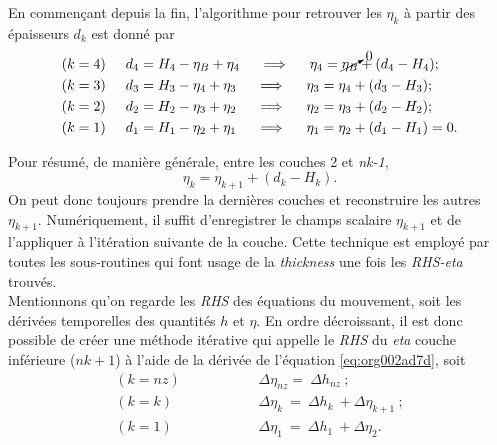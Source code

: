 \documentclass[10pt]{article}
\numberwithin{equation}{section}
\begin{document}
En commençant depuis la fin, l'algorithme pour retrouver les \(\eta_k\) à partir des épaisseurs \(d_k\) est donné par
\begin{align}
        & (k=4) \hspace{0.5cm} d_4 = H_4 - \eta_B + \eta_4 \hspace{0.5cm} \Longrightarrow \hspace{0.5cm} \eta_4 = \cancelto{0}{\eta_B} + (d_4 - H_4); \\
        & (k=3) \hspace{0.5cm} d_3 = H_3 - \eta_4 + \eta_3 \hspace{0.5cm} \Longrightarrow \hspace{0.5cm} \eta_3 =\eta_4+(d_3-H_3);\\
        & (k=2) \hspace{0.5cm} d_2 = H_2 - \eta_3 + \eta_2 \hspace{0.5cm} \Longrightarrow \hspace{0.5cm} \eta_2 =\eta_3+(d_2-H_2);\\
        & (k=1) \hspace{0.5cm} d_1 = H_1 - \eta_2 + \eta_1 \hspace{0.5cm} \Longrightarrow \hspace{0.5cm} \eta_1 =\eta_2+(d_1-H_1) = 0.
\end{align}

Pour résumé, de manière générale, entre les couches 2 et \emph{nk-1},
\begin{equation}
\label{eq:org002ad7d}
\eta_k = \eta_{k+1} + (d_k - H_k).
\end{equation}
On peut donc toujours prendre la dernières couches et reconstruire les autres \(\eta_{k+1}\).
Numériquement, il suffit d'enregistrer le champs scalaire \(\eta_{k+1}\) et de l'appliquer à l'itération suivante de la couche.
Cette technique est employé par toutes les sous-routines qui font usage de la \emph{thickness} une fois les \emph{RHS-eta} trouvés.\\


Mentionnons qu'on regarde les \emph{RHS} des équations du mouvement, soit les dérivées temporelles des quantités \(h\) et \(\eta\).
En ordre décroissant, il est donc possible de créer une méthode itérative qui appelle le \emph{RHS} du \emph{eta} couche inférieure (\(nk+1\)) à l'aide de la dérivée de l'équation \ref{eq:org002ad7d}, soit
\begin{align}
(k=nz)\hspace{2cm}    &\Delta \eta_{nz} =\ \Delta h_{nz}\ ;\nonumber\\
(k=k) \hspace{2cm} &\Delta \eta_{k}\ = \ \Delta h_k\ + \Delta \eta_{k+1}\ ;\\
(k=1) \hspace{2cm} &\Delta \eta_1\ = \ \Delta h_1\ + \Delta \eta_2. \nonumber 
\end{align}
\end{document}
